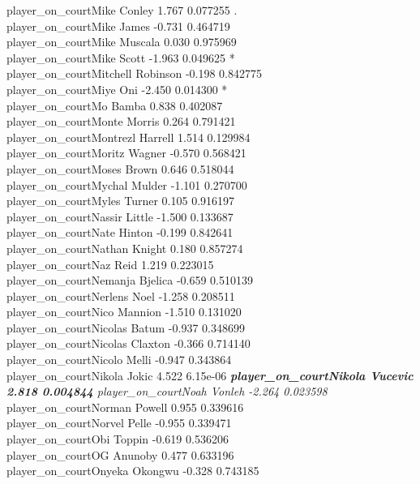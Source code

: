 \documentclass[
  landscape]{article}
\begin{document}
player\_on\_courtMike Conley 1.767 0.077255 .\\
player\_on\_courtMike James -0.731 0.464719\\
player\_on\_courtMike Muscala 0.030 0.975969\\
player\_on\_courtMike Scott -1.963 0.049625 *\\
player\_on\_courtMitchell Robinson -0.198 0.842775\\
player\_on\_courtMiye Oni -2.450 0.014300 *\\
player\_on\_courtMo Bamba 0.838 0.402087\\
player\_on\_courtMonte Morris 0.264 0.791421\\
player\_on\_courtMontrezl Harrell 1.514 0.129984\\
player\_on\_courtMoritz Wagner -0.570 0.568421\\
player\_on\_courtMoses Brown 0.646 0.518044\\
player\_on\_courtMychal Mulder -1.101 0.270700\\
player\_on\_courtMyles Turner 0.105 0.916197\\
player\_on\_courtNassir Little -1.500 0.133687\\
player\_on\_courtNate Hinton -0.199 0.842641\\
player\_on\_courtNathan Knight 0.180 0.857274\\
player\_on\_courtNaz Reid 1.219 0.223015\\
player\_on\_courtNemanja Bjelica -0.659 0.510139\\
player\_on\_courtNerlens Noel -1.258 0.208511\\
player\_on\_courtNico Mannion -1.510 0.131020\\
player\_on\_courtNicolas Batum -0.937 0.348699\\
player\_on\_courtNicolas Claxton -0.366 0.714140\\
player\_on\_courtNicolo Melli -0.947 0.343864\\
player\_on\_courtNikola Jokic 4.522 6.15e-06 \emph{\textbf{
player\_on\_courtNikola Vucevic 2.818 0.004844 } player\_on\_courtNoah
Vonleh -2.264 0.023598 }\\
player\_on\_courtNorman Powell 0.955 0.339616\\
player\_on\_courtNorvel Pelle -0.955 0.339471\\
player\_on\_courtObi Toppin -0.619 0.536206\\
player\_on\_courtOG Anunoby 0.477 0.633196\\
player\_on\_courtOnyeka Okongwu -0.328 0.743185\\
\end{document}
